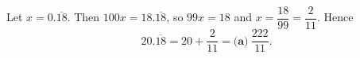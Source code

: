 Let $x=0.\overline{18}$. Then $100x=18.\overline{18}$, so $99x=18$ and $x=\dfrac{18}{99}=\dfrac{2}{11}$. Hence
\[
20.\overline{18}=20+\dfrac{2}{11}=\boxed{\textbf{(a)}\ \dfrac{222}{11}} .
\]
